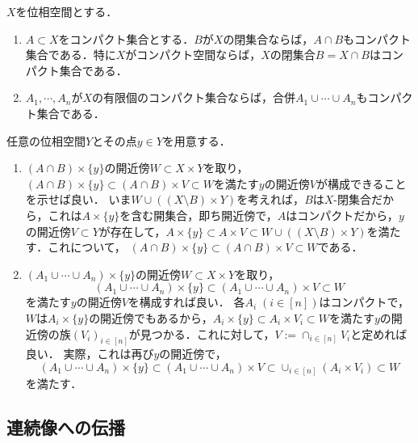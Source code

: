 \documentclass[uplatex,dvipdfmx]{jsreport}
\begin{document}
\begin{corollary}\label{cor-union-intersection-of-compact-sets-is-compact}
    $X$を位相空間とする．
    \begin{enumerate}
        \item $A\subset X$をコンパクト集合とする．$B$が$X$の閉集合ならば，$A\cap B$もコンパクト集合である．特に$X$がコンパクト空間ならば，$X$の閉集合$B=X\cap B$はコンパクト集合である．
        \item $A_1,\cdots,A_n$が$X$の有限個のコンパクト集合ならば，合併$A_1\cup\cdots\cup A_n$もコンパクト集合である．
    \end{enumerate}
\end{corollary}
\begin{Proof}
    任意の位相空間$Y$とその点$y\in Y$を用意する．
    \begin{enumerate}
        \item $(A\cap B)\times\{y\}$の開近傍$W\subset X\times Y$を取り，$(A\cap B)\times\{y\}\subset (A\cap B)\times V\subset W$を満たす$y$の開近傍$V$が構成できることを示せば良い．
        いま$W\cup((X\setminus B)\times Y)$を考えれば，$B$は$X$-閉集合だから，これは$A\times\{y\}$を含む開集合，即ち開近傍で，$A$はコンパクトだから，$y$の開近傍$V\subset Y$が存在して，$A\times\{y\}\subset A\times V\subset W\cup((X\setminus B)\times Y)$を満たす．これについて，
        $(A\cap B)\times\{y\}\subset(A\cap B)\times V\subset W$である．
        \item 
        $(A_1\cup\cdots\cup A_n)\times\{y\}$の開近傍$W\subset X\times Y$を取り，
        \[(A_1\cup\cdots\cup A_n)\times\{y\}\subset (A_1\cup\cdots\cup A_n)\times V\subset W\]
        を満たす$y$の開近傍$V$を構成すれば良い．
        各$A_i\;(i\in[n])$はコンパクトで，$W$は$A_i\times\{y\}$の開近傍でもあるから，$A_i\times\{y\}\subset A_i\times V_i\subset W$を満たす$y$の開近傍の族$(V_i)_{i\in[n]}$が見つかる．これに対して，$V:=\cap_{i\in[n]}V_i$と定めれば良い．
        実際，これは再び$y$の開近傍で，
        \[(A_1\cup\cdots\cup A_n)\times\{y\}\subset (A_1\cup\cdots\cup A_n)\times V\subset\cup_{i\in[n]}(A_i\times V_i)\subset W\]
        を満たす．
    \end{enumerate}
\end{Proof}

\subsection{連続像への伝播}
\end{document}
